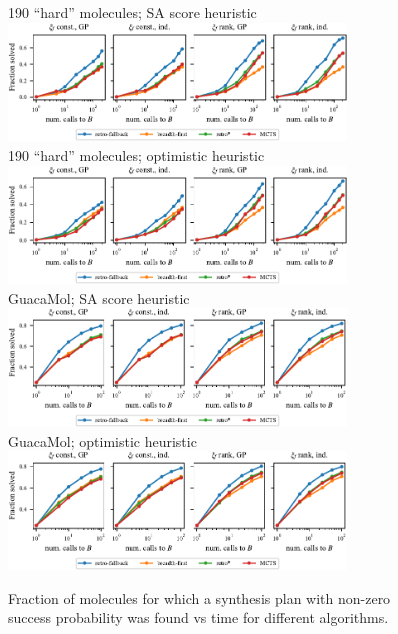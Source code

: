 \begin{figure}[htb]
    \centering
    {190 ``hard'' molecules; SA score heuristic} \\
    \vspace{0.1cm}
    \includegraphics[width=0.8\textwidth]{figures/comparison/retrostar190/frac_solved_sascore.pdf} \\
    \vspace{0.1cm}
    {190 ``hard'' molecules; optimistic heuristic} \\
    \vspace{0.1cm}
    \includegraphics[width=0.8\textwidth]{figures/comparison/retrostar190/frac_solved_optimistic.pdf} \\
    \vspace{0.1cm}
    {GuacaMol; SA score heuristic} \\
    \vspace{0.1cm}
    \includegraphics[width=0.8\textwidth]{figures/comparison/guacamol/frac_solved_sascore.pdf} \\
    \vspace{0.1cm}
    {GuacaMol; optimistic heuristic} \\
    \vspace{0.1cm}
    \includegraphics[width=0.8\textwidth]{figures/comparison/guacamol/frac_solved_optimistic.pdf}
    \caption[Fraction of molecules with any synthesis plan.]{
        Fraction of molecules for which a synthesis plan
        with non-zero success probability was found
        vs time
        for different algorithms.
    }
    \label{fig:fraction solved}
\end{figure}




